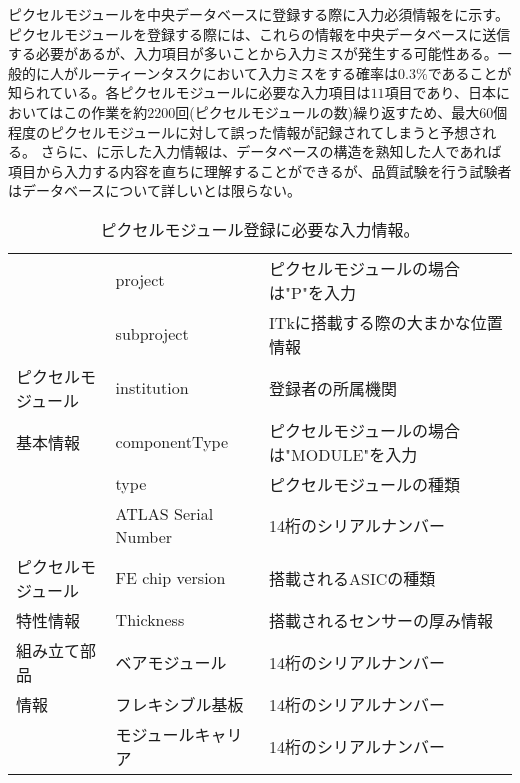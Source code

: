 ピクセルモジュールを中央データベースに登録する際に入力必須情報をに示す。
ピクセルモジュールを登録する際には、これらの情報を中央データベースに送信する必要があるが、入力項目が多いことから入力ミスが発生する可能性ある。一般的に人がルーティーンタスクにおいて入力ミスをする確率は$0.3\%$であることが知られている\cite{human}。各ピクセルモジュールに必要な入力項目は$11$項目であり、日本においてはこの作業を約$2200$回(ピクセルモジュールの数)繰り返すため、最大$60$個程度のピクセルモジュールに対して誤った情報が記録されてしまうと予想される。
さらに、に示した入力情報は、データベースの構造を熟知した人であれば項目から入力する内容を直ちに理解することができるが、品質試験を行う試験者はデータベースについて詳しいとは限らない。

\begin{table}[tbp]
  \begin{center}
    \caption[ピクセルモジュール登録に必要な入力情報]{ピクセルモジュール登録に必要な入力情報。}
    \label{tab:nyuuryoku}
    \begin{tabular}{|l||l|l|}
    \hline
    & project &  ピクセルモジュールの場合は"P"を入力 \\
    \cline{2-3}
    & subproject & ITkに搭載する際の大まかな位置情報 \\
    \cline{2-3}
    ピクセルモジュール
    & institution & 登録者の所属機関 \\
    \cline{2-3}
    基本情報
    & componentType & ピクセルモジュールの場合は"MODULE"を入力 \\
    \cline{2-3}
    & type & ピクセルモジュールの種類 \\
    \cline{2-3}
    & ATLAS Serial Number & 14桁のシリアルナンバー \\
    \hline
    ピクセルモジュール
    & FE chip version & 搭載されるASICの種類 \\
    \cline{2-3}
    特性情報 & Thickness & 搭載されるセンサーの厚み情報 \\
    \hline
    組み立て部品 & ベアモジュール & 14桁のシリアルナンバー \\
    \cline{2-3}
    情報 & フレキシブル基板 & 14桁のシリアルナンバー \\
    \cline{2-3}
     & モジュールキャリア & 14桁のシリアルナンバー \\
    \hline
    \end{tabular}
  \end{center}
\end{table}

